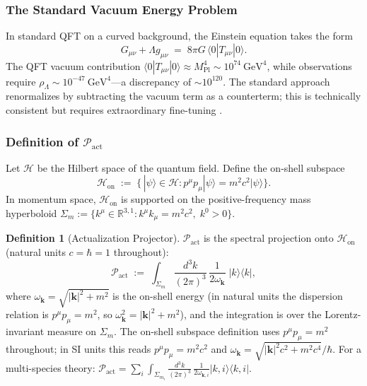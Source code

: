 \documentclass[11pt,a4paper]{article}
\theoremstyle{plain}
\theoremstyle{definition}
\newtheorem{definition}[theorem]{Definition}
\theoremstyle{remark}
\newcommand{\Pact}{\mathcal{P}_{\mathrm{act}}}
\newcommand{\Hon}{\mathcal{H}_{\mathrm{on}}}
\newcommand{\Sigmam}{\Sigma_{m}}
\newcommand{\ket}[1]{|#1\rangle}
\newcommand{\bra}[1]{\langle #1|}
\begin{document}
\subsubsection{The Standard Vacuum Energy Problem}

In standard QFT on a curved background, the Einstein equation takes the form
\begin{equation}
  G_{\mu\nu} + \Lambda g_{\mu\nu}
  \;=\;
  8\pi G\,\langle 0 | T_{\mu\nu} | 0 \rangle.
\end{equation}
The QFT vacuum contribution $\langle 0|T_{\mu\nu}|0\rangle \approx M_{\mathrm{Pl}}^{4}
\sim 10^{74}~\mathrm{GeV}^{4}$, while observations require $\rho_{\Lambda} \sim
10^{-47}~\mathrm{GeV}^{4}$---a discrepancy of $\sim\!10^{120}$. The standard approach
renormalizes by subtracting the vacuum term as a counterterm; this is technically
consistent but requires extraordinary fine-tuning \citep{Weinberg1989}.

\subsubsection{Definition of \texorpdfstring{$\Pact$}{P\_act}}

Let $\mathcal{H}$ be the Hilbert space of the quantum field. Define the on-shell
subspace
\begin{equation}
  \Hon
  \;:=\;
  \bigl\{\,\ket{\psi} \in \mathcal{H} :
    p^{\mu}p_{\mu}\ket{\psi} = m^{2}c^{2}\ket{\psi}
  \bigr\}.
\end{equation}
In momentum space, $\Hon$ is supported on the positive-frequency mass hyperboloid
$\Sigmam := \{k^{\mu} \in \mathbb{R}^{3,1} : k^{\mu}k_{\mu} = m^{2}c^{2},\;
k^{0} > 0\}$.

\begin{definition}[Actualization Projector]
$\Pact$ is the spectral projection onto $\Hon$ (natural units $c = \hbar = 1$
throughout):
\begin{equation}
  \Pact
  \;:=\;
  \int_{\Sigmam} \frac{d^{3}k}{(2\pi)^{3}}\,\frac{1}{2\omega_{\mathbf{k}}}
  \;\ket{k}\!\bra{k},
\end{equation}
where $\omega_{\mathbf{k}} = \sqrt{|\mathbf{k}|^{2} + m^{2}}$ is the
on-shell energy (in natural units the dispersion relation is
$p^{\mu}p_{\mu} = m^{2}$, so $\omega_{\mathbf{k}}^{2} = |\mathbf{k}|^2 + m^2$),
and the integration is over the Lorentz-invariant measure on $\Sigmam$.
The on-shell subspace definition uses $p^{\mu}p_{\mu} = m^{2}$ throughout;
in SI units this reads $p^{\mu}p_{\mu} = m^{2}c^{2}$ and
$\omega_{\mathbf{k}} = \sqrt{|\mathbf{k}|^{2}c^{2} + m^{2}c^{4}}/\hbar$.
For a multi-species theory:
$\Pact = \sum_{i} \int_{\Sigma_{m_{i}}} \frac{d^{3}k}{(2\pi)^{3}}\,
\frac{1}{2\omega_{\mathbf{k},i}} \ket{k,i}\!\bra{k,i}$.
\end{definition}
\end{document}
